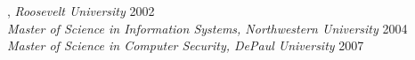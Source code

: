 \vspace*{5pt}
, \textit{Roosevelt University} \hfill	2002
\vspace*{5pt} \\
\textit{Master of Science in Information Systems, Northwestern University} 	\hfill 2004
\vspace*{5pt} \\
\textit{Master of Science in Computer Security, DePaul University} \hfill  2007
